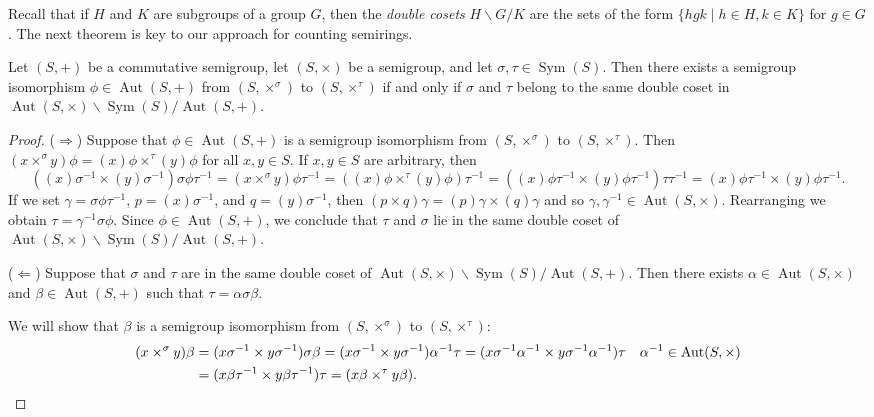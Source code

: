 \documentclass{article}
\theoremstyle{plain}
\theoremstyle{definition}
\newcommand{\Sym}{\operatorname{Sym}}
\newcommand{\Aut}{\operatorname{Aut}}
\begin{document}
Recall that if $H$ and $K$ are subgroups of a group $G$, then the
\textit{double cosets} $H\backslash G / K$ are the sets of the form
$\{hgk\mid h\in H, k \in K\}$ for $g\in G$.
The next theorem is key to our approach for counting semirings.

\begin{theorem}
  \label{thm:isomorphism-condition}
  Let \((S, +)\) be a commutative semigroup, let \((S, \times)\) be a
  semigroup, and let \(\sigma, \tau\in\Sym(S)\). Then there exists a
  semigroup isomorphism $\phi\in \Aut(S, +)$
  from \((S,\times^\sigma)\) to \((S, \times ^ \tau)\) if
  and only if \(\sigma\) and \(\tau\) belong to the same double coset in
  \(\Aut(S, \times) \backslash \Sym(S) / \Aut(S, +)\).
\end{theorem}

\begin{proof}
  ($\Rightarrow$) Suppose that $\phi\in \Aut(S, +)$ is a semigroup isomorphism
  from $(S, \times ^ \sigma)$ to $(S, \times^\tau)$. Then $(x \times ^ \sigma
  y)\phi = (x)\phi\times ^ \tau (y)\phi$ for all $x, y\in S$. If $x, y\in S$
  are arbitrary, then
  \[
    ((x)\sigma ^ {-1} \times (y)\sigma ^ {-1})\sigma \phi \tau ^ {-1} =
    (x \times ^ \sigma y)\phi\tau ^ {-1}
    = ((x)\phi \times ^ {\tau} (y)\phi)\tau ^ {-1}
    = ((x)\phi\tau^{-1}\times (y)\phi\tau^{-1})\tau\tau^{-1}
    = (x)\phi\tau ^ {-1} \times (y)\phi\tau ^ {-1}.
  \]
  If we set $\gamma = \sigma\phi\tau^{-1}$, $p =
  (x)\sigma^{-1}$, and $q=(y)\sigma^{-1}$, then
  $(p\times q)\gamma = (p)\gamma \times (q)\gamma$
  and so $\gamma, \gamma ^ {-1} \in \Aut(S, \times)$.
  Rearranging we obtain $\tau = \gamma^{-1}\sigma\phi$. Since $\phi \in
  \Aut(S, +)$, we conclude that $\tau$ and $\sigma$ lie in the
  same double coset of $\Aut(S, \times) \backslash \Sym(S) / \Aut(S, +)$.

  ($\Leftarrow$) Suppose that $\sigma$ and $\tau$ are in the
  same double coset of $\Aut(S, \times) \backslash \Sym(S) / \Aut(S, +)$.
  Then there exists $\alpha\in\Aut(S, \times)$ and $\beta\in\Aut(S, +)$ such
  that $\tau=\alpha\sigma\beta$.

  We will show that $\beta$ is a semigroup isomorphism from $(S, \times
  ^{\sigma})$ to $(S, \times^{\tau})$:
  \begin{align*}
    (x\times^\sigma y)\beta
    &= (x\sigma ^{-1} \times y\sigma ^{-1})\sigma \beta
    = (x\sigma ^{-1} \times y\sigma ^{-1})\alpha^{-1}\tau
    = (x\sigma ^{-1}\alpha^{-1} \times y\sigma ^{-1}\alpha^{-1})\tau &&
    \alpha^{-1} \in \Aut(S, \times)\\
    &= (x\beta\tau^{-1} \times y\beta\tau^{-1})\tau
    = (x\beta \times^{\tau} y\beta).\qedhere
  \end{align*}
\end{proof}
\end{document}
